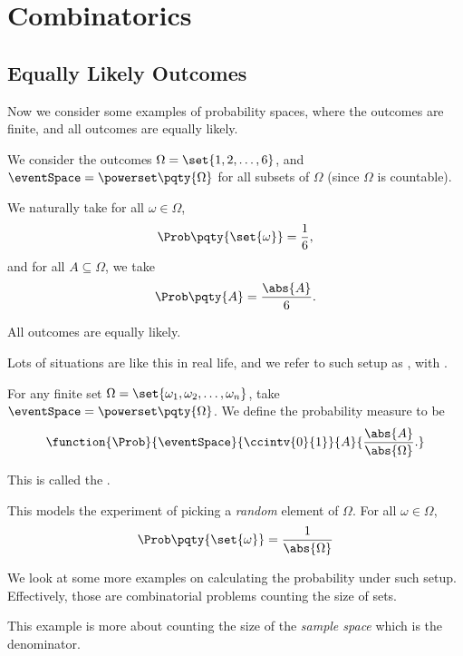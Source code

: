 \section{Combinatorics}

\subsection{Equally Likely Outcomes}
Now we consider some examples of probability spaces, where the outcomes are finite, and all outcomes are equally likely.

\begin{example}
    \label{ex:rolling-a-fair-die}%
    We consider the outcomes \(\Omega = \set{1, 2, \ldots, 6}\), and \(\eventSpace = \powerset\pqty{\Omega}\) for all subsets of \(\Omega\) (since \(\Omega\) is countable).
        
    We naturally take for all \(\omega \in \Omega\),
    \[
        \Prob\pqty{\set{\omega}} = \frac{1}{6},
    \]
    and for all \(A \subseteq \Omega\), we take
    \[
        \Prob\pqty{A} = \frac{\abs{A}}{6}.
    \]

    All outcomes are equally likely.
\end{example}

Lots of situations are like this in real life, and we refer to such setup as , with .

\begin{definition}
    \label{def:equally-likely-outcomes}%
    For any finite set \(\Omega = \set{\omega_1, \omega_2, \ldots, \omega_n}\), take \(\eventSpace = \powerset\pqty{\Omega}\). We define the probability measure to be
    \[
        \function{\Prob}{\eventSpace}{\ccintv{0}{1}}{A}{\frac{\abs{A}}{\abs{\Omega}}.}
    \]

    This is called the .
\end{definition}

This models the experiment of picking a \emph{random} element of \(\Omega\). For all \(\omega \in \Omega\),
\[
    \Prob\pqty{\set{\omega}} = \frac{1}{\abs{\Omega}}
\]

We look at some more examples on calculating the probability under such setup. Effectively, those are combinatorial problems counting the size of sets.

This example is more about counting the size of the \emph{sample space} which is the denominator.

